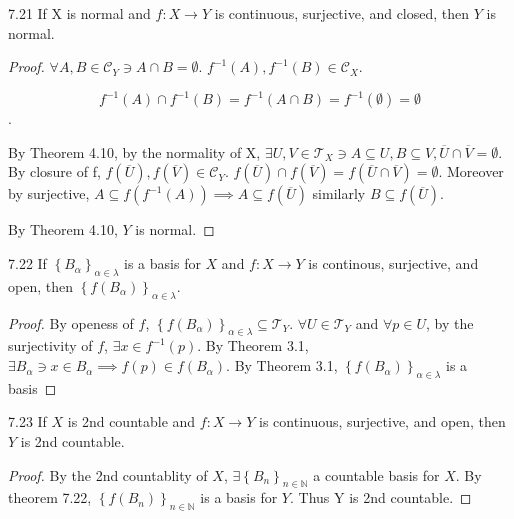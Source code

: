 \documentclass{article}
\newcommand*{\T}{\mathcal{T}}
\newcommand*{\subeq}{\subseteq}
\newcommand*{\empset}{\emptyset}
\newcommand{\N}{\mathbb{N}}
\begin{document}
\bigskip



\begin{claim}{7.21}\label{Claim 7.21.}
    If X is normal and $f: X \to Y$ is continuous, surjective, and closed, then $Y$ is normal.
\end{claim}
\begin{proof}
    $\forall A, B \in \mathcal{C}_Y \ni A \cap B = \empset$. $f^{-1}(A), f^{-1}(B) \in \mathcal{C}_X$. 
    
    \[f^{-1}(A) \cap f^{-1}(B) = f^{-1}(A \cap B) = f^{-1}(\empset) = \empset\]. 
    
    By Theorem 4.10, by the normality of X, $\exists U, V \in \T_X \ni A \subeq U, B \subeq V, \overline{U} \cap \overline{V} = \empset$. By closure of f, $f(\overline{U}), f(\overline{V}) \in \mathcal{C}_Y$. $f(\overline{U})\cap f(\overline{V}) = f(\overline{U} \cap \overline{V}) = \empset$. Moreover by surjective, $A \subseteq f(f^{-1}(A)) \implies A \subeq f(\overline{U})$ similarly $B \subeq f(\overline{U})$. 
    
    By Theorem 4.10, $Y$ is normal.        
\end{proof}

\bigskip

\begin{claim}{7.22}\label{Claim 7.22.}
    If $\left\{ B_\alpha \right\}_{\alpha \in \lambda}$ is a basis for $X$ and $f: X \to Y$ is continous, surjective, and open, then $\left\{ f(B_{\alpha}) \right\}_{\alpha \in \lambda}$.     
\end{claim}
\begin{proof}
    By openess of $f$, $\left\{ f(B_{\alpha}) \right\}_{\alpha \in \lambda} \subeq \T_Y$. $\forall U \in \T_Y$ and $\forall p \in U$, by the surjectivity of $f$, $\exists x \in f^{-1}(p)$. By Theorem 3.1, $\exists B_{\alpha} \ni x \in B_\alpha \implies f(p) \in f(B_{\alpha})$. By Theorem 3.1, $\left\{ f(B_{\alpha}) \right\}_{\alpha \in \lambda}$ is a basis        
\end{proof}

\bigskip

\begin{claim}{7.23}\label{Claim 7.23.}
    If $X$ is 2nd countable and $f: X \to Y$ is continuous, surjective, and open, then $Y$ is 2nd countable.
\end{claim}
\begin{proof}
    By the 2nd countablity of $X$, $\exists \left\{ B_{n} \right\}_{n \in \N}$ a countable basis for $X$. By theorem 7.22, $\left\{ f(B_{n}) \right\}_{n \in \N}$ is a basis for $Y$. Thus Y is 2nd countable.      
\end{proof}
\end{document}
